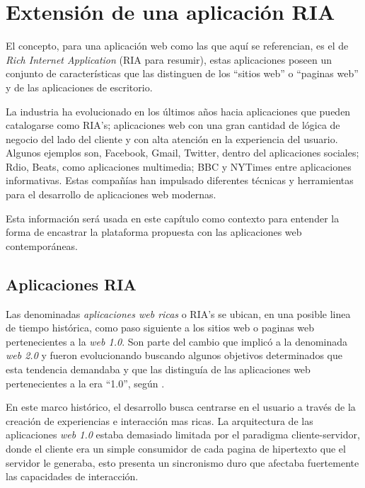 
\chapter{Extensi\'{o}n de una aplicaci\'{o}n RIA} %

\label{ch:ria_extension} 

El concepto, para una aplicación web como las que aquí se referencian, es el de \emph{Rich Internet Application} (RIA para resumir), estas aplicaciones poseen un conjunto de características que las distinguen de los ``sitios web'' o ``paginas web'' y de las aplicaciones de escritorio. 

La industria ha evolucionado en los últimos años hacia aplicaciones que pueden catalogarse como RIA's; aplicaciones web con una gran cantidad de lógica de negocio del lado del cliente y con alta atención en la experiencia del usuario. Algunos ejemplos son, Facebook, Gmail, Twitter, dentro del aplicaciones sociales; Rdio, Beats, como aplicaciones multimedia; BBC y NYTimes entre aplicaciones informativas. Estas compañías han impulsado diferentes técnicas y herramientas para el desarrollo de aplicaciones web modernas. 

Esta información será usada en este capítulo como contexto para entender la forma de encastrar la plataforma propuesta con las aplicaciones web contemporáneas.

\section{Aplicaciones RIA} \label{sec:extension_ria_intro}

Las denominadas \emph{aplicaciones web ricas} o RIA's se ubican, en una posible linea de tiempo histórica, como paso siguiente a los sitios web o paginas web pertenecientes a la \emph{web 1.0}. Son parte del cambio que implicó a la denominada \emph{web 2.0} y fueron evolucionando buscando algunos objetivos determinados que esta tendencia demandaba y que las distinguía de las aplicaciones web pertenecientes a la era ``1.0'', según \citet{Farrell2007}. 

En este marco histórico, el desarrollo busca centrarse en el usuario a través de la creación de experiencias e interacción mas ricas. La arquitectura de las aplicaciones \emph{web 1.0} estaba demasiado limitada por el paradigma cliente-servidor, donde el cliente era un simple consumidor de cada pagina de hipertexto que el servidor le generaba, esto presenta un sincronismo duro que afectaba fuertemente las capacidades de interacción.

